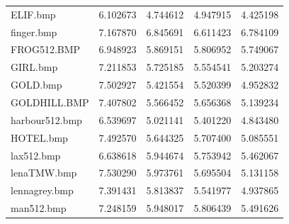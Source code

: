 \documentclass{article}
\begin{document}
\begin{table}[H]
\begin{adjustbox}{center}
\begin{tabular}{lrrrr}
    ELIF.bmp           & 6.102673                     & 4.744612                               & 4.947915                                  & 4.425198                                   \\
    finger.bmp         & 7.167870                     & 6.845691                               & 6.611423                                  & 6.784109                                   \\
    FROG512.BMP        & 6.948923                     & 5.869151                               & 5.806952                                  & 5.749067                                   \\
    GIRL.bmp           & 7.211853                     & 5.725185                               & 5.554541                                  & 5.203274                                   \\
    GOLD.bmp           & 7.502927                     & 5.421554                               & 5.520399                                  & 4.952832                                   \\
    GOLDHILL.BMP       & 7.407802                     & 5.566452                               & 5.656368                                  & 5.139234                                   \\
    harbour512.bmp     & 6.539697                     & 5.021141                               & 5.401220                                  & 4.843480                                   \\
    HOTEL.bmp          & 7.492570                     & 5.644325                               & 5.707400                                  & 5.085551                                   \\
    lax512.bmp         & 6.638618                     & 5.944674                               & 5.753942                                  & 5.462067                                   \\
    lenaTMW.bmp        & 7.530290                     & 5.973761                               & 5.695504                                  & 5.131158                                   \\
    lennagrey.bmp      & 7.391431                     & 5.813837                               & 5.541977                                  & 4.937865                                   \\
    man512.bmp         & 7.248159                     & 5.948017                               & 5.806439                                  & 5.491626                                   \\

\end{tabular}
\end{adjustbox}
\end{table}
\end{document}
